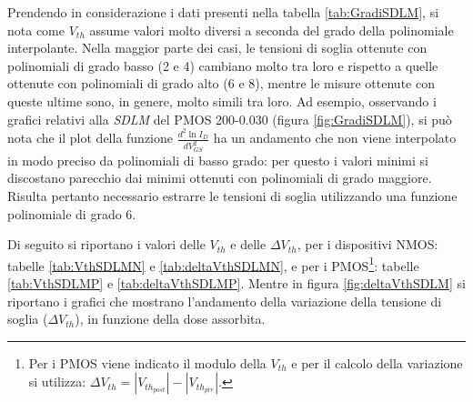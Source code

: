 Prendendo in considerazione i dati presenti nella tabella \ref{tab:GradiSDLM}, si nota come $V_{th}$ assume valori molto diversi a seconda del grado della polinomiale interpolante. Nella maggior parte dei casi, le tensioni di soglia ottenute con polinomiali di grado basso (2 e 4) cambiano molto tra loro e rispetto a quelle ottenute con polinomiali di grado alto (6 e 8), mentre le misure ottenute con queste ultime sono, in genere, molto simili tra loro. Ad esempio, osservando i grafici relativi alla \emph{SDLM} del PMOS 200-0.030 (figura \ref{fig:GradiSDLM}), si può nota che il plot della funzione $\frac{d^2 \ln I_D}{dV_{GS}^2}$ ha un andamento che non viene interpolato in modo preciso da polinomiali di basso grado: per questo i valori minimi si discostano parecchio dai minimi ottenuti con polinomiali di grado maggiore. Risulta pertanto necessario estrarre le tensioni di soglia utilizzando una funzione polinomiale di grado 6.

Di seguito si riportano i valori delle $V_{th}$ e delle $\Delta V_{th}$, per i dispositivi NMOS: tabelle \ref{tab:VthSDLMN} e \ref{tab:deltaVthSDLMN}, e per i PMOS\footnote{Per i PMOS viene indicato il modulo della $V_{th}$ e per il calcolo della variazione si utilizza: $\Delta V_{th} = |V_{th_{post}}| - |V_{th_{pre}}|$.}: tabelle \ref{tab:VthSDLMP} e \ref{tab:deltaVthSDLMP}. Mentre in figura \ref{fig:deltaVthSDLM} si riportano i grafici che mostrano l'andamento della variazione della tensione di soglia ($\Delta V_{th}$), in funzione della dose assorbita.

